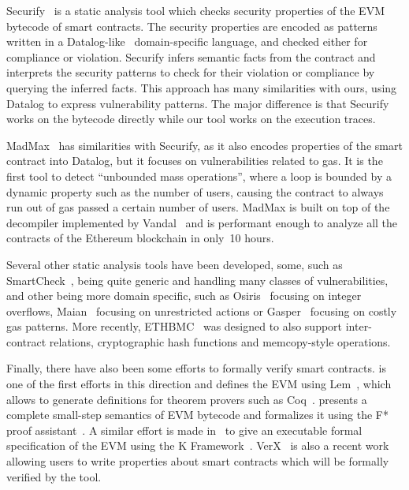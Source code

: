 Securify~\cite{Tsankov2018} is a static analysis tool which checks security properties of the EVM bytecode of smart contracts.
The security properties are encoded as patterns written in a Datalog-like~\cite{ullman1984principles} domain-specific language, and checked either for compliance or violation.
Securify infers semantic facts from the contract and interprets the security patterns to check for their violation or compliance by querying the inferred facts.
This approach has many similarities with ours, using Datalog to express vulnerability patterns.
The major difference is that Securify works on the bytecode directly while our tool works on the execution traces.

MadMax~\cite{Grech2018} has similarities with Securify, as it also encodes properties of the smart contract into Datalog, but it focuses on vulnerabilities related to gas.
It is the first tool to detect ``unbounded mass operations'', where a loop is bounded by a dynamic property such as the number of users, causing the contract to always run out of gas passed a certain number of users.
MadMax is built on top of the decompiler implemented by Vandal~\cite{Brent2018} and is performant enough to analyze all the contracts of the Ethereum blockchain in only~10 hours.

Several other static analysis tools have been developed, some, such as SmartCheck~\cite{Tikhomirov2017}, being quite generic and handling many classes of vulnerabilities, and other being more domain specific, such as Osiris~\cite{torres2018osiris} focusing on integer overflows, Maian~\cite{Nikolic2018a} focusing on unrestricted actions or Gasper~\cite{Chen2017} focusing on costly gas patterns.
More recently, ETHBMC~\cite{251546} was designed to also support inter-contract relations, cryptographic hash functions and memcopy-style operations.

Finally, there have also been some efforts to formally verify smart contracts. \cite{Hirai2017} is one of the first efforts in this direction and defines the EVM using Lem~\cite{mulligan2014lem}, which allows to generate definitions for theorem provers such as Coq~\cite{barras1997coq}. \cite{Grishchenko2018} presents a complete small-step semantics of EVM bytecode and formalizes it using the F* proof assistant~\cite{SwamyCFSBY11}. A similar effort is made in~\cite{Hildenbrandt2018} to give an executable formal specification of the EVM using the K Framework~\cite{rosu-serbanuta-2010-jlap}. VerX~\cite{permenev2019verx} is also a recent work allowing users to write properties about smart contracts which will be formally verified by the tool.

